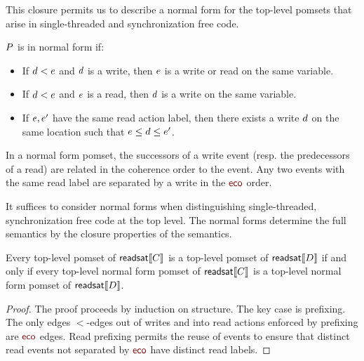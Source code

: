 This closure permits us to  describe a normal form for the top-level pomsets that arise in single-threaded and synchronization free code.  
\begin{definition}
$P$ is in normal form if:
\begin{itemize}
\item If $d < e$ and  $d$ is a write, then $e$ is a write or read on the same variable.
\item If $d < e$ and  $e$ is a read, then $d$ is a write on the same variable. 
    
\item If $e, e'$ have the same read action label, then there exists a write $d$ on the same location such that $e \leq d \leq e'$.
\end{itemize}
\end{definition}
In a normal form pomset, the successors of a write event (resp. the predecessors of a read) are related in the coherence order to the event.  Any two events with the same read label are separated by a write in the $\reco$ order. 

It suffices to consider normal forms when distinguishing single-threaded, synchronization free code at the top level.  The normal forms determine the full semantics by the closure properties of the semantics.

\begin{lemma}\label{unrhd}
Every top-level pomset of $\mathsf{readsat}\llbracket C\rrbracket$ is a top-level pomset of $\mathsf{readsat}\llbracket D\rrbracket$ if and only if 
every top-level normal form pomset of $\mathsf{readsat}\llbracket C\rrbracket$ is a top-level normal form pomset of $\mathsf{readsat}\llbracket D\rrbracket$.
\begin{proof}
The proof proceeds by induction on structure.  The key case is prefixing.  The only edges $\lt$-edges out of writes  and into read actions enforced by prefixing are $\reco$ edges.  Read prefixing permits the reuse of events to ensure that distinct read events not separated by $\reco$ have distinct read labels.  
\end{proof}
\end{lemma}

